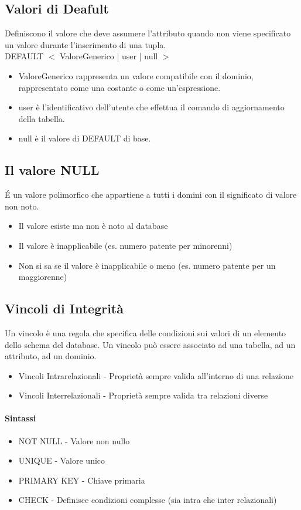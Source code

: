 \subsection{Valori di Deafult}
Definiscono il valore che deve assumere l'attributo quando non viene specificato 
un valore durante l'inserimento di una tupla.\\
DEFAULT $<$ ValoreGenerico | user | null $>$
\begin{itemize}
  \item ValoreGenerico rappresenta un valore compatibile con il dominio,
  rappresentato come una costante o come un’espressione.
  \item user è l’identificativo dell’utente che effettua il comando di
  aggiornamento della tabella.
  \item null è il valore di DEFAULT di base.
\end{itemize}
\subsection{Il valore NULL}
\'E un valore polimorfico che appartiene a tutti i domini con il significato di valore
non noto.
\begin{itemize}
  \item Il valore esiste ma non è noto al database
  \item Il valore è inapplicabile (es. numero patente per minorenni)
  \item Non si sa se il valore è inapplicabile o meno (es. numero patente per un maggiorenne)
\end{itemize}
\subsection{Vincoli di Integrità}
Un vincolo è una regola che specifica delle condizioni sui valori di un elemento
dello schema del database. Un vincolo può essere associato ad una tabella, ad un attributo,
ad un dominio.
\begin{itemize}
  \item Vincoli Intrarelazionali - Proprietà sempre valida all'interno di una relazione
  \item Vincoli Interrelazionali - Proprietà sempre valida tra relazioni diverse
\end{itemize}
\paragraph*{Sintassi}
\begin{itemize}
  \item NOT NULL - Valore non nullo
  \item UNIQUE - Valore unico
  \item PRIMARY KEY - Chiave primaria
  \item CHECK - Definisce condizioni complesse (sia intra che inter relazionali)
\end{itemize}
